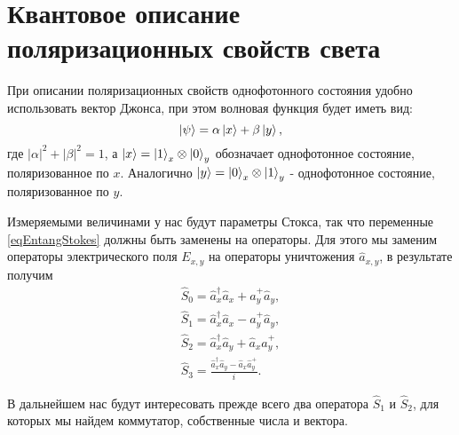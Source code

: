 \section{Квантовое описание поляризационных свойств света}
При описании поляризационных свойств однофотонного состояния удобно
использовать вектор Джонса, при этом волновая функция будет иметь вид:
\begin{equation}
\left|\psi\right> = 
\alpha \ket{x} + 
\beta \ket{y},
\label{eqEntangSimpleState}
\end{equation}
где $\left|\alpha\right|^2 + \left|\beta\right|^2 = 1$, а
$\ket{x} = \ket{1}_x\otimes\ket{0}_y$ обозначает
однофотонное состояние, поляризованное по $x$. Аналогично 
$\ket{y} = \ket{0}_x\otimes\ket{1}_y$ -
однофотонное состояние, поляризованное по $y$. 

Измеряемыми величинами у нас будут параметры Стокса, так что переменные
\eqref{eqEntangStokes} должны быть заменены на операторы. Для этого мы
заменим операторы электрического поля $E_{x,y}$ на операторы
уничтожения $\hat{a}_{x,y}$, в результате получим
\begin{eqnarray}
\hat{S}_0 = \hat{a}_x^{\dag} \hat{a}_x + \hat{a}_y^{+} \hat{a}_y,
\nonumber \\
\hat{S}_1 = \hat{a}_x^{\dag} \hat{a}_x - \hat{a}_y^{+} \hat{a}_y,
\nonumber \\
\hat{S}_2 = \hat{a}_x^{\dag} \hat{a}_y + \hat{a}_x \hat{a}_y^{+},
\nonumber \\
\hat{S}_3 = \frac{\hat{a}_x^{\dag} \hat{a}_y - \hat{a}_x \hat{a}_y^{+}}{i}.
\label{eqEntangStokesOper}
\end{eqnarray}

В дальнейшем нас будут интересовать прежде всего два оператора
$\hat{S}_1$ и $\hat{S}_2$, для которых мы найдем коммутатор,
собственные числа и вектора.

